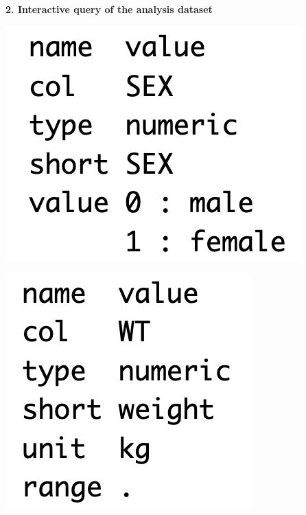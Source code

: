 \documentclass[portrait,fontscale=0.46,paperwidth=36in,paperheight=48in]{baposter}
\begin{document}
\begin{poster}
{\begin{minipage}[c]{0.333\linewidth}
\begin{demobx}[]
	
	\vspace{1mm}
	\textbf{2. Interactive query of the analysis dataset}

	\begin{minipage}[c]{0.45\linewidth}
	\end{minipage} %
	\begin{minipage}[c]{0.45\linewidth}
	\end{minipage} 
	

	\begin{minipage}[c]{0.15\linewidth}
	\end{minipage} 
	\begin{minipage}[c]{0.3\linewidth}
		\includegraphics[scale=0.35]{"images/spec-sex.png"} 
	\end{minipage} 
	\begin{minipage}[c]{0.15\linewidth}
	\end{minipage} 
	\begin{minipage}[c]{0.25\linewidth}
		\includegraphics[scale=0.35]{"images/spec-wt.png"} 
	\end{minipage} 


\end{demobx}
\end{minipage}}
\end{poster}
\end{document}
